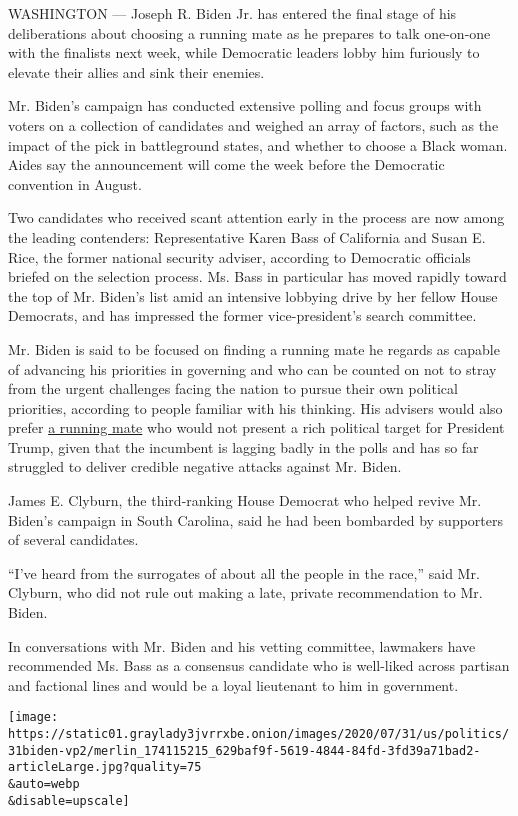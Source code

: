 WASHINGTON --- Joseph R. Biden Jr. has entered the final stage of his
deliberations about choosing a running mate as he prepares to talk
one-on-one with the finalists next week, while Democratic leaders lobby
him furiously to elevate their allies and sink their enemies.

Mr. Biden's campaign has conducted extensive polling and focus groups
with voters on a collection of candidates and weighed an array of
factors, such as the impact of the pick in battleground states, and
whether to choose a Black woman. Aides say the announcement will come
the week before the Democratic convention in August.

Two candidates who received scant attention early in the process are now
among the leading contenders: Representative Karen Bass of California
and Susan E. Rice, the former national security adviser, according to
Democratic officials briefed on the selection process. Ms. Bass in
particular has moved rapidly toward the top of Mr. Biden's list amid an
intensive lobbying drive by her fellow House Democrats, and has
impressed the former vice-president's search committee.

Mr. Biden is said to be focused on finding a running mate he regards as
capable of advancing his priorities in governing and who can be counted
on not to stray from the urgent challenges facing the nation to pursue
their own political priorities, according to people familiar with his
thinking. His advisers would also prefer
\href{https://www.nytimes3xbfgragh.onion/article/biden-vice-president-2020.html}{a
running mate} who would not present a rich political target for
President Trump, given that the incumbent is lagging badly in the polls
and has so far struggled to deliver credible negative attacks against
Mr. Biden.

James E. Clyburn, the third-ranking House Democrat who helped revive Mr.
Biden's campaign in South Carolina, said he had been bombarded by
supporters of several candidates.

``I've heard from the surrogates of about all the people in the race,''
said Mr. Clyburn, who did not rule out making a late, private
recommendation to Mr. Biden.

In conversations with Mr. Biden and his vetting committee, lawmakers
have recommended Ms. Bass as a consensus candidate who is well-liked
across partisan and factional lines and would be a loyal lieutenant to
him in government.

\texttt{[image: https://static01.graylady3jvrrxbe.onion/images/2020/07/31/us/politics/31biden-vp2/merlin\_174115215\_629baf9f-5619-4844-84fd-3fd39a71bad2-articleLarge.jpg?quality=75\\\&auto=webp\\\&disable=upscale]}

